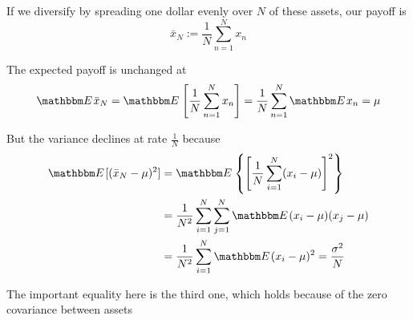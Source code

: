 \begin{frame}

    \vspace{2em}
    If we diversify by
    spreading one dollar evenly over $N$ of these assets, our payoff is
    \begin{equation*}
        \bar x_N := \frac{1}{N} \sum_{n=1}^N x_n
    \end{equation*}
    
    \vspace{1em}
    The expected payoff is unchanged at 
    \begin{equation*}
        \label{eq:meanub}
        \EE  \bar x_N 
            = \EE \left[ \frac{1}{N} \sum_{n=1}^N x_n \right]
            = \frac{1}{N} \sum_{n=1}^N \EE  x_n 
            = \mu
    \end{equation*}
    
\end{frame}


\begin{frame}

    \vspace{2em}
    But the variance declines at rate $\frac{1}{N}$ because
    \begin{align*}
        \EE [(\bar x_N - \mu)^2 ]  
        & = \EE \left\{ \left[ \frac{1}{N} \sum_{i=1}^N (x_i - \mu) \right]^2 \right\}
        \\
        & = \frac{1}{N^2} \sum_{i=1}^N \sum_{j=1}^N \EE (x_i - \mu)(x_j - \mu) 
        \\& = \frac{1}{N^2} \sum_{i=1}^N \EE (x_i - \mu)^2 
        = \frac{\sigma^2}{N} 
    \end{align*}
    
    The important equality here is the third one, which holds because of the zero
    covariance between assets
    
\end{frame}

